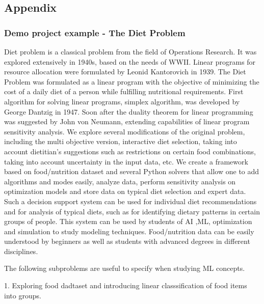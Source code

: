 {{{\subsection{Appendix}

\subsubsection{ Demo project  example - The Diet Problem}

Diet problem is a classical problem from the field of Operations Research.  It was explored extensively in 1940s, based on the needs of WWII. Linear programs for resource allocation were formulated by Leonid Kantorovich in 1939. The Diet Problem was formulated as a linear program with the objective of minimizing the cost of a daily diet of a person while fulfilling nutritional requirements. First algorithm for solving linear programs, simplex algorithm, was developed by George Dantzig in 1947. Soon after the duality theorem for linear programming was suggested by John von Neumann, extending capabilities of linear program sensitivity analysis. 
We explore several modifications of the original problem, including the multi objective version, interactive diet selection, taking into account dietitian’s suggestions such as restrictions on certain food combinations, taking into account uncertainty in the input data, etc. We create a framework based on food/nutrition dataset and several Python solvers that allow one to add algorithms and modes easily, analyze data, perform sensitivity analysis on optimization models and store data on typical diet selection and expert data. Such a decision support system can be used for individual diet recommendations and for analysis of typical diets, such as for identifying dietary patterns in certain groups of people. This system can be used by students of AI ,ML,  optimization and simulation to study modeling techniques. Food/nutrition data can be easily understood by beginners as well as students with advanced degrees in different disciplines.  


The following subproblems are useful to specify when studying ML concepts. 

1. Exploring food dadtaset and introducing linear classsification of food items into groups. 

}}}
